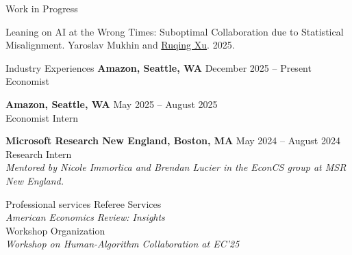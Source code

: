 \documentclass{resume} %
\begin{document}
\begin{rSection}{Work in Progress}

Leaning on AI at the Wrong Times: Suboptimal Collaboration due to Statistical Misalignment. Yaroslav Mukhin and \underline{Ruqing Xu}. 2025.

\end{rSection}

\begin{rSection}{Industry Experiences}
  {\bf Amazon, Seattle, WA} \hfill {December 2025 -- Present} \\
  Economist \vspace{-0.5em}

  {\bf Amazon, Seattle, WA} \hfill {May 2025 -- August 2025} \\
  Economist Intern \vspace{-0.5em}

  {\bf Microsoft Research New England, Boston, MA} \hfill {May 2024 -- August 2024} \\
  Research Intern \\
  \emph{Mentored by Nicole Immorlica and Brendan Lucier in the EconCS group at MSR New England.}
  
\end{rSection}

\begin{rSection}{Professional services}
Referee Services\\
\-\hspace{1em}\emph{American Economics Review: Insights} \\
Workshop Organization \\
\-\hspace{1em}\emph{Workshop on Human-Algorithm Collaboration at EC'25}
\end{rSection}
\end{document}
